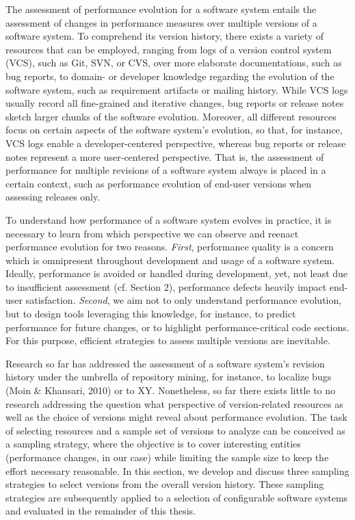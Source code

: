 
The assessment of performance evolution for a software system entails the
assessment of changes in performance measures over multiple versions of a
software system. To comprehend its version history, there exists a variety of
resources that can be employed, ranging from logs of a version control system
(VCS), such as Git, SVN, or CVS, over more elaborate documentations, such as
bug reports, to domain- or developer knowledge regarding the evolution of the
software system, such as requirement artifacts or mailing history. While VCS
logs usually record all fine-grained and iterative changes, bug reports or
release notes sketch larger chunks of the software evolution. Moreover, all
different resources focus on certain aspects of the software system’s
evolution, so that, for instance, VCS logs enable a developer-centered
perspective, whereas bug reports or release notes represent a more
user-centered perspective. That is, the assessment of performance for multiple
revisions of a software system always is placed in a certain context, such as
performance evolution of end-user versions when assessing releases only.

To understand how performance of a software system evolves in practice, it is
necessary to learn from which perspective we can observe and reenact
performance evolution for two reasons. \emph{First}, performance quality is a
concern which is omnipresent throughout development and usage of a software system.
Ideally, performance is avoided or handled during development, yet, not least
due to insufficient assessment (cf. Section 2), performance defects heavily
impact end-user satisfaction. \emph{Second}, we aim not to only understand
performance evolution, but to design tools leveraging this knowledge, for instance, to
predict performance for future changes, or to highlight performance-critical
code sections. For this purpose, efficient strategies to assess multiple
versions are inevitable.

Research so far has addressed the assessment of a software system’s revision
history under the umbrella of repository mining, for instance, to localize bugs
(Moin \& Khansari, 2010) or to XY. Nonetheless, so far there exists little to no
research addressing the question what perspective of version-related resources
as well as the choice of versions might reveal about performance evolution. The
task of selecting resources and a sample set of versions to analyze can be
conceived as a sampling strategy, where the objective is to cover interesting
entities (performance changes, in our case) while limiting the sample size to
keep the effort necessary reasonable. In this section, we develop and discuss
three sampling strategies to select versions from the overall version history.
These sampling strategies are subsequently applied to a selection of
configurable software systems and evaluated in the remainder of this thesis.


